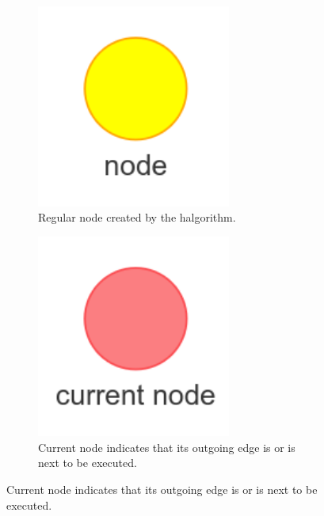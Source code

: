 \begin{figure}[H]
    \centering
    \begin{subfigure}{0.2\textwidth}
    \centering
    \includegraphics[width=0.7\textwidth]{figures/proposed_method/connecting_nodes/legend/node}
    \caption{Regular node created by the \ac{halgorithm}.\newline}%
    \end{subfigure}
    \begin{subfigure}{0.2\textwidth}
    \centering
    \includegraphics[width=0.7\textwidth]{figures/proposed_method/connecting_nodes/legend/current_node}
    \caption{Current node indicates that its outgoing edge is or is next to be executed.}%
    \end{subfigure}

\end{figure}

